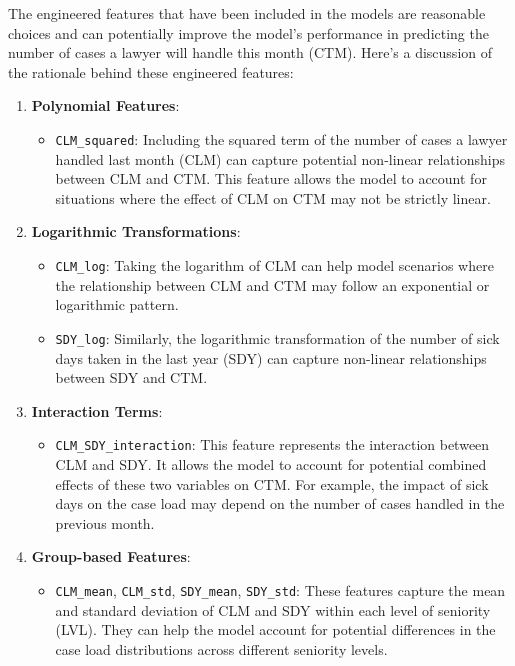 \documentclass{article}
\begin{document}
\noindent The engineered features that have been included in the models are reasonable choices and can potentially improve the model's performance in predicting the number of cases a lawyer will handle this month (CTM). Here's a discussion of the rationale behind these engineered features:

\begin{enumerate}
    \item \textbf{Polynomial Features}:
    \begin{itemize}
        \item \texttt{CLM\_squared}: Including the squared term of the number of cases a lawyer handled last month (CLM) can capture potential non-linear relationships between CLM and CTM. This feature allows the model to account for situations where the effect of CLM on CTM may not be strictly linear.
    \end{itemize}
    
    \item \textbf{Logarithmic Transformations}:
    \begin{itemize}
        \item \texttt{CLM\_log}: Taking the logarithm of CLM can help model scenarios where the relationship between CLM and CTM may follow an exponential or logarithmic pattern.
        \item \texttt{SDY\_log}: Similarly, the logarithmic transformation of the number of sick days taken in the last year (SDY) can capture non-linear relationships between SDY and CTM.
    \end{itemize}
    
    \item \textbf{Interaction Terms}:
    \begin{itemize}
        \item \texttt{CLM\_SDY\_interaction}: This feature represents the interaction between CLM and SDY. It allows the model to account for potential combined effects of these two variables on CTM. For example, the impact of sick days on the case load may depend on the number of cases handled in the previous month.
    \end{itemize}
    
    \item \textbf{Group-based Features}:
    \begin{itemize}
        \item \texttt{CLM\_mean}, \texttt{CLM\_std}, \texttt{SDY\_mean}, \texttt{SDY\_std}: These features capture the mean and standard deviation of CLM and SDY within each level of seniority (LVL). They can help the model account for potential differences in the case load distributions across different seniority levels.
    \end{itemize}
    

\end{enumerate}
\end{document}
